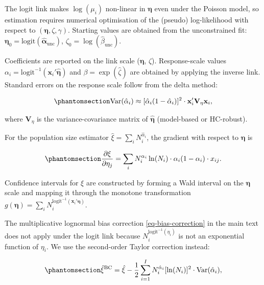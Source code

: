The logit link makes $\log(\mu_i)$ non-linear in $\boldsymbol{\eta}$
even under the Poisson model, so estimation requires numerical
optimisation of the (pseudo) log-likelihood with respect to
$(\boldsymbol{\eta}, \zeta, \gamma)$. Starting values are obtained
from the unconstrained fit:
$\boldsymbol{\eta}_0 = \text{logit}(\hat{\boldsymbol{\alpha}}_{\text{unc}})$,
$\zeta_0 = \log(\hat{\beta}_{\text{unc}})$.

Coefficients are reported on the link scale ($\boldsymbol{\eta}$,
$\zeta$). Response-scale values
$\alpha_i = \text{logit}^{-1}(\mathbf{x}_i' \hat{\boldsymbol{\eta}})$
and $\beta = \exp(\hat\zeta)$ are obtained by applying the inverse
link. Standard errors on the response scale follow from the delta
method:

\begin{equation}\protect\phantomsection\label{eq-constrained-var-alpha}{
\text{Var}(\hat\alpha_i) \approx [\hat\alpha_i(1 - \hat\alpha_i)]^2 \cdot \mathbf{x}_i' \mathbf{V}_{\eta} \mathbf{x}_i,
}\end{equation}

where $\mathbf{V}_{\eta}$ is the variance-covariance matrix of
$\hat{\boldsymbol{\eta}}$ (model-based or HC-robust).

For the population size estimator
$\hat\xi = \sum_i N_i^{\hat\alpha_i}$, the gradient with respect to
$\boldsymbol{\eta}$ is

\begin{equation}\protect\phantomsection\label{eq-constrained-gradient}{
\frac{\partial \xi}{\partial \eta_j} = \sum_i N_i^{\alpha_i} \ln(N_i) \cdot \alpha_i(1 - \alpha_i) \cdot x_{ij}.
}\end{equation}

Confidence intervals for $\xi$ are constructed by forming a Wald
interval on the $\boldsymbol{\eta}$ scale and mapping it through the
monotone transformation
$g(\boldsymbol{\eta}) = \sum_i N_i^{\text{logit}^{-1}(\mathbf{x}_i' \boldsymbol{\eta})}$.

The multiplicative lognormal bias correction \eqref{eq-bias-correction}
in the main text does not apply under the logit link because
$N_i^{\text{logit}^{-1}(\eta_i)}$ is not an exponential function of
$\eta_i$. We use the second-order Taylor correction instead:

\begin{equation}\protect\phantomsection\label{eq-constrained-bc}{
\hat{\xi}^{\text{BC}} = \hat{\xi} - \frac{1}{2} \sum_{i=1}^{I} N_i^{\hat{\alpha}_i} [\ln(N_i)]^2 \cdot \text{Var}(\hat{\alpha}_i),
}\end{equation}

